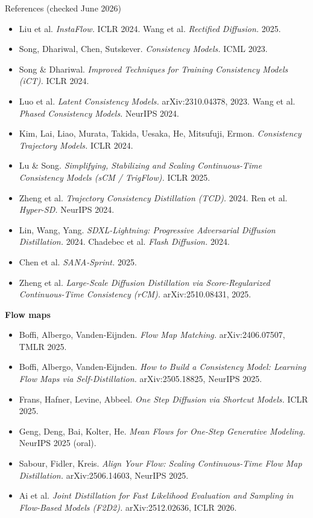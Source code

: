 \documentclass[aspectratio=169,10pt]{beamer}
\begin{document}
\begin{frame}[allowframebreaks]{References (checked June 2026)}
\begin{itemize}
    \item Liu et al. \emph{InstaFlow.} ICLR 2024. \quad Wang et al. \emph{Rectified Diffusion.} 2025.
    \item Song, Dhariwal, Chen, Sutskever. \emph{Consistency Models.} ICML 2023.
    \item Song \& Dhariwal. \emph{Improved Techniques for Training Consistency Models (iCT).} ICLR 2024.
    \item Luo et al. \emph{Latent Consistency Models.} arXiv:2310.04378, 2023. \quad Wang et al. \emph{Phased Consistency Models.} NeurIPS 2024.
    \item Kim, Lai, Liao, Murata, Takida, Uesaka, He, Mitsufuji, Ermon. \emph{Consistency Trajectory Models.} ICLR 2024.
    \item Lu \& Song. \emph{Simplifying, Stabilizing and Scaling Continuous-Time Consistency Models (sCM / TrigFlow).} ICLR 2025.
    \item Zheng et al. \emph{Trajectory Consistency Distillation (TCD).} 2024. \quad Ren et al. \emph{Hyper-SD.} NeurIPS 2024.
    \item Lin, Wang, Yang. \emph{SDXL-Lightning: Progressive Adversarial Diffusion Distillation.} 2024. \quad Chadebec et al. \emph{Flash Diffusion.} 2024.
    \item Chen et al. \emph{SANA-Sprint.} 2025.
    \item Zheng et al. \emph{Large-Scale Diffusion Distillation via Score-Regularized Continuous-Time Consistency (rCM).} arXiv:2510.08431, 2025.
  \end{itemize}
  \textbf{Flow maps}
  \begin{itemize}
    \item Boffi, Albergo, Vanden-Eijnden. \emph{Flow Map Matching.} arXiv:2406.07507, TMLR 2025.
    \item Boffi, Albergo, Vanden-Eijnden. \emph{How to Build a Consistency Model: Learning Flow Maps via Self-Distillation.} arXiv:2505.18825, NeurIPS 2025.
    \item Frans, Hafner, Levine, Abbeel. \emph{One Step Diffusion via Shortcut Models.} ICLR 2025.
    \item Geng, Deng, Bai, Kolter, He. \emph{Mean Flows for One-Step Generative Modeling.} NeurIPS 2025 (oral).
    \item Sabour, Fidler, Kreis. \emph{Align Your Flow: Scaling Continuous-Time Flow Map Distillation.} arXiv:2506.14603, NeurIPS 2025.
    \item Ai et al. \emph{Joint Distillation for Fast Likelihood Evaluation and Sampling in Flow-Based Models (F2D2).} arXiv:2512.02636, ICLR 2026.

\end{itemize}
\end{frame}
\end{document}
